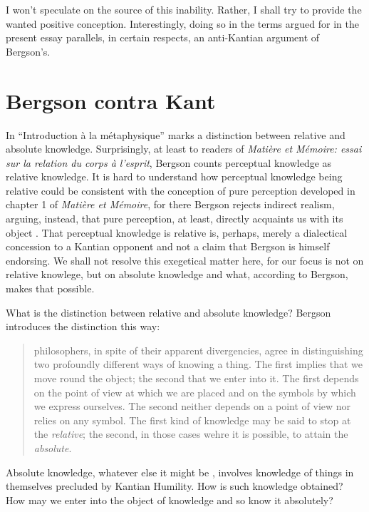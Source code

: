 I won't speculate on the source of this inability. Rather, I shall try to provide the wanted positive conception. Interestingly, doing so in the terms argued for in the present essay parallels, in certain respects, an anti-Kantian argument of Bergson's.


\section{Bergson contra Kant} %
\label{sec:bergson_contra_kant}

In ``Introduction \`{a} la m\'{e}taphysique'' \citet{Bergson:1903nx} marks a distinction between relative and absolute knowledge. Surprisingly, at least to readers of \emph{Mati\`{e}re et M\'{e}moire: essai sur la relation du corps \`{a} l'esprit}, Bergson counts perceptual knowledge as relative knowledge. It is hard to understand how perceptual knowledge being relative could be consistent with the conception of pure perception developed in chapter 1 of \emph{Mati\`{e}re et M\'{e}moire}, for there Bergson rejects indirect realism, arguing, instead, that pure perception, at least, directly acquaints us with its object \citep[though see][for a reconciliationist reading, 39--41]{Moore:1996rt}. That perceptual knowledge is relative is, perhaps, merely a dialectical concession to a Kantian opponent and not a claim that Bergson is himself endorsing. We shall not resolve this exegetical matter here, for our focus is not on relative knowlege, but on absolute knowledge and what, according to Bergson, makes that possible.

What is the distinction between relative and absolute knowledge? Bergson introduces the distinction this way:
\begin{quote}
	philosophers, in spite of their apparent divergencies, agree in distinguishing two profoundly different ways of knowing a thing. The first implies that we move round the object; the second that we enter into it. The first depends on the point of view at which we are placed and on the symbols by which we express ourselves. The second neither depends on a point of view nor relies on any symbol. The first kind of knowledge may be said to stop at the \emph{relative}; the second, in those cases wehre it is possible, to attain the \emph{absolute}. \citep[1]{Bergson:1912ud}
\end{quote}
Absolute knowledge, whatever else it might be \citep[for discussion see][chapter 6]{Lacey:1989bv}, involves knowledge of things in themselves precluded by Kantian Humility. How is such knowledge obtained? How may we enter into the object of knowledge and so know it absolutely?

